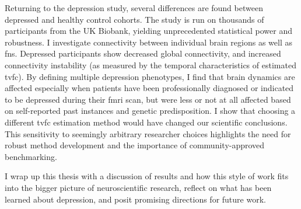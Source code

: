 Returning to the depression study, several differences are found between depressed and healthy control cohorts.
The study is run on thousands of participants from the UK Biobank, yielding unprecedented statistical power and robustness.
I investigate connectivity between individual brain regions as well as \glspl{fn}.
Depressed participants show decreased global connectivity, and increased connectivity instability (as measured by the temporal characteristics of estimated \gls{tvfc}).
By defining multiple depression phenotypes, I find that brain dynamics are affected especially when patients have been professionally diagnosed or indicated to be depressed during their \gls{fmri} scan, but were less or not at all affected based on self-reported past instances and genetic predisposition.
I show that choosing a different \gls{tvfc} estimation method would have changed our scientific conclusions.
This sensitivity to seemingly arbitrary researcher choices highlights the need for robust method development and the importance of community-approved benchmarking.

I wrap up this thesis with a discussion of results and how this style of work fits into the bigger picture of neuroscientific research, reflect on what has been learned about depression, and posit promising directions for future work.
